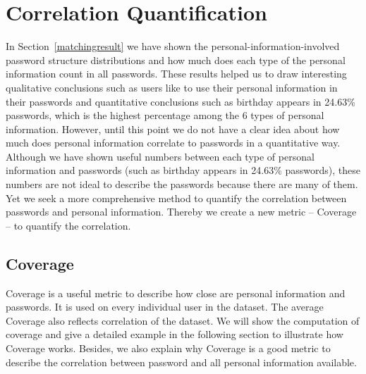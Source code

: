 \section{Correlation Quantification}
\label{correlationquantification}
In Section~\ref{matchingresult} we have shown the personal-information-involved password structure distributions and how much does each type of the personal information count in all passwords. These results helped us to draw interesting qualitative conclusions such as users like to use their personal information in their passwords and quantitative conclusions such as birthday appears in 24.63\% passwords, which is the highest percentage among the 6 types of personal information.
However, until this point we do not have a clear idea about how much does personal information correlate to passwords in a quantitative way. Although we have shown useful numbers between each type of personal information and passwords (such as birthday appears in 24.63\% passwords), these numbers are not ideal to describe the passwords because there are many of them. Yet we seek a more comprehensive method to quantify the correlation between passwords and personal information. Thereby we create a new metric -- Coverage -- to quantify the correlation. 

\subsection{Coverage}
\label{coverage}

Coverage is a useful metric to describe how close are personal information and passwords. It is used on every individual user in the dataset. The average Coverage also reflects correlation of the dataset. We will show the computation of coverage and give a detailed example in the following section to illustrate how Coverage works. Besides, we also explain why Coverage is a good metric to describe the correlation between password and all personal information available. 
